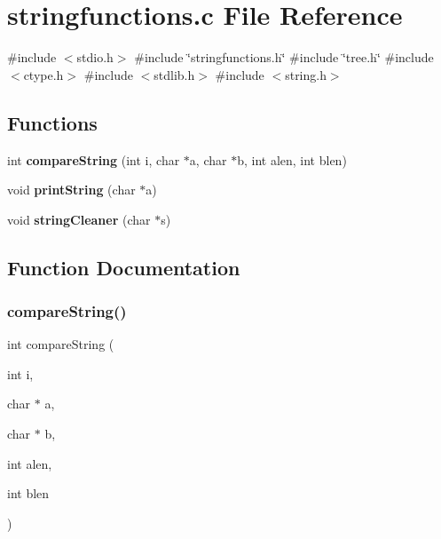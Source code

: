 \section{stringfunctions.\+c File Reference}
\label{stringfunctions_8c}
{\ttfamily \#include $<$stdio.\+h$>$}\newline
{\ttfamily \#include \char`\"{}stringfunctions.\+h\char`\"{}}\newline
{\ttfamily \#include \char`\"{}tree.\+h\char`\"{}}\newline
{\ttfamily \#include $<$ctype.\+h$>$}\newline
{\ttfamily \#include $<$stdlib.\+h$>$}\newline
{\ttfamily \#include $<$string.\+h$>$}\newline
\subsection*{Functions}
\begin{DoxyCompactItemize}
\item 
int \textbf{ compare\+String} (int i, char $\ast$a, char $\ast$b, int alen, int blen)
\item 
void \textbf{ print\+String} (char $\ast$a)
\item 
void \textbf{ string\+Cleaner} (char $\ast$s)
\end{DoxyCompactItemize}


\subsection{Function Documentation}
\mbox{\label{stringfunctions_8c_ad7bf079bacd4ef94c68cfaf02477fad4}} 
\subsubsection{compare\+String()}
{\footnotesize\ttfamily int compare\+String (\begin{DoxyParamCaption}\item[{int}]{i,  }\item[{char $\ast$}]{a,  }\item[{char $\ast$}]{b,  }\item[{int}]{alen,  }\item[{int}]{blen }\end{DoxyParamCaption})}

